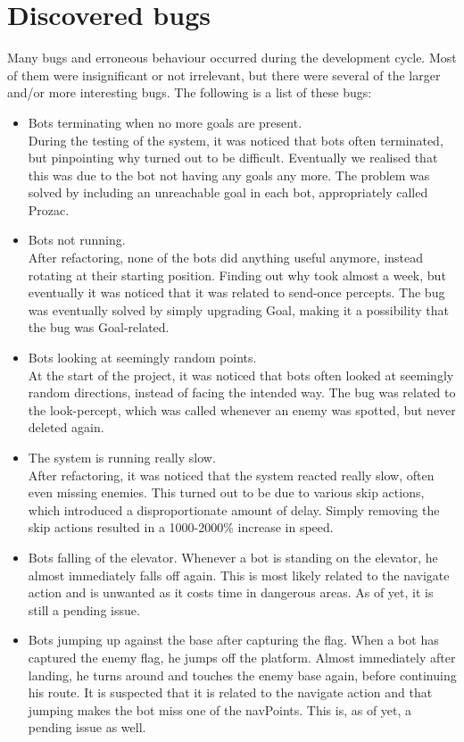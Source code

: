 \section{Discovered bugs}
Many bugs and erroneous behaviour occurred during the development cycle. Most of them were insignificant or not irrelevant, but there were several of the larger and/or more interesting bugs. The following is a list of these bugs:

\begin{itemize}
\item Bots terminating when no more goals are present. \\
	During the testing of the system, it was noticed that bots often terminated, but pinpointing why turned out to be difficult. Eventually we realised that this was due to the bot not having any goals any more. The problem was solved by including an unreachable goal in each bot, appropriately called Prozac.
	\\
\item Bots not running. \\
	After refactoring, none of the bots did anything useful anymore, instead rotating at their starting position. Finding out why took almost a week, but eventually it was noticed that it was related to send-once percepts. The bug was eventually solved by simply upgrading Goal, making it a possibility that the bug was Goal-related.
	\\
\item Bots looking at seemingly random points. \\
	At the start of the project, it was noticed that bots often looked at seemingly random directions, instead of facing the intended way. The bug was related to the look-percept, which was called whenever an enemy was spotted, but never deleted again. 
	\\
\item The system is running really slow. \\
	After refactoring, it was noticed that the system reacted really slow, often even missing enemies. This turned out to be due to various skip actions, which introduced a disproportionate amount of delay. Simply removing the skip actions resulted in a 1000-2000\% increase in speed.
	\\
\item Bots falling of the elevator.
	Whenever a bot is standing on the elevator, he almost immediately falls off again. This is most likely related to the navigate action and is unwanted as it costs time in dangerous areas. As of yet, it is still a pending issue. 
	\\
\item Bots jumping up against the base after capturing the flag.
	When a bot has captured the enemy flag, he jumps off the platform. Almost immediately after landing, he turns around and touches the enemy base again, before continuing his route. It is suspected that it is related to the navigate action and that jumping makes the bot miss one of the navPoints. This is, as of yet, a pending issue as well. 
	\\
\end{itemize}